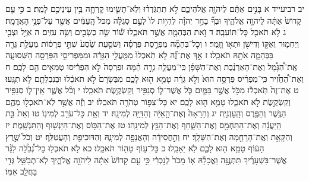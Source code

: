 \documentclass[twoside, openany, parskip=half, 11pt]{book}
\begin{document}
יב רביעייד א בָּנִ֣ים אַתֶּ֔ם לַיהֹוָ֖ה אֱלֹהֵיכֶ֑ם לֹ֣א תִתְגֹּֽדְד֗וּ וְלֹֽא־תָשִׂ֧ימוּ קׇרְחָ֛ה בֵּ֥ין עֵינֵיכֶ֖ם לָמֵֽת׃ ב כִּ֣י עַ֤ם קָדוֹשׁ֙ אַתָּ֔ה לַיהֹוָ֖ה אֱלֹהֶ֑יךָ וּבְךָ֞ בָּחַ֣ר יְהֹוָ֗ה לִֽהְי֥וֹת לוֹ֙ לְעַ֣ם סְגֻלָּ֔ה מִכֹּל֙ הָֽעַמִּ֔ים אֲשֶׁ֖ר עַל־פְּנֵ֥י הָאֲדָמָֽה׃
ג לֹ֥א תֹאכַ֖ל כׇּל־תּוֹעֵבָֽה׃ ד זֹ֥את הַבְּהֵמָ֖ה אֲשֶׁ֣ר תֹּאכֵ֑לוּ שׁ֕וֹר שֵׂ֥ה כְשָׂבִ֖ים וְשֵׂ֥ה עִזִּֽים׃ ה אַיָּ֥ל וּצְבִ֖י וְיַחְמ֑וּר וְאַקּ֥וֹ וְדִישֹׁ֖ן וּתְא֥וֹ וָזָֽמֶר׃ ו וְכׇל־בְּהֵמָ֞ה מַפְרֶ֣סֶת פַּרְסָ֗ה וְשֹׁסַ֤עַת שֶׁ֙סַע֙ שְׁתֵּ֣י פְרָס֔וֹת מַעֲלַ֥ת גֵּרָ֖ה בַּבְּהֵמָ֑ה אֹתָ֖הּ תֹּאכֵֽלוּ׃ ז אַ֣ךְ אֶת־זֶ֞ה לֹ֤א תֹֽאכְלוּ֙ מִמַּֽעֲלֵ֣י הַגֵּרָ֔ה וּמִמַּפְרִיסֵ֥י הַפַּרְסָ֖ה הַשְּׁסוּעָ֑ה אֶֽת־הַ֠גָּמָ֠ל וְאֶת־הָאַרְנֶ֨בֶת וְאֶת־הַשָּׁפָ֜ן כִּֽי־מַעֲלֵ֧ה גֵרָ֣ה הֵ֗מָּה וּפַרְסָה֙ לֹ֣א הִפְרִ֔יסוּ טְמֵאִ֥ים הֵ֖ם לָכֶֽם׃ ח וְאֶת־הַ֠חֲזִ֠יר כִּֽי־מַפְרִ֨יס פַּרְסָ֥ה הוּא֙ וְלֹ֣א גֵרָ֔ה טָמֵ֥א ה֖וּא לָכֶ֑ם מִבְּשָׂרָם֙ לֹ֣א תֹאכֵ֔לוּ וּבְנִבְלָתָ֖ם לֹ֥א תִגָּֽעוּ׃
ט אֶת־זֶה֙ תֹּֽאכְל֔וּ מִכֹּ֖ל אֲשֶׁ֣ר בַּמָּ֑יִם כֹּ֧ל אֲשֶׁר־ל֛וֹ סְנַפִּ֥יר וְקַשְׂקֶ֖שֶׂת תֹּאכֵֽלוּ׃ י וְכֹ֨ל אֲשֶׁ֧ר אֵֽין־ל֛וֹ סְנַפִּ֥יר וְקַשְׂקֶ֖שֶׂת לֹ֣א תֹאכֵ֑לוּ טָמֵ֥א ה֖וּא לָכֶֽם׃
יא כׇּל־צִפּ֥וֹר טְהֹרָ֖ה תֹּאכֵֽלוּ׃ יב וְזֶ֕ה אֲשֶׁ֥ר לֹֽא־תֹאכְל֖וּ מֵהֶ֑ם הַנֶּ֥שֶׁר וְהַפֶּ֖רֶס וְהָֽעׇזְנִיָּֽה׃ יג וְהָרָאָה֙ וְאֶת־הָ֣אַיָּ֔ה וְהַדַּיָּ֖ה לְמִינָֽהּ׃ יד וְאֵ֥ת כׇּל־עֹרֵ֖ב לְמִינֽוֹ׃ טו וְאֵת֙ בַּ֣ת הַֽיַּעֲנָ֔ה וְאֶת־הַתַּחְמָ֖ס וְאֶת־הַשָּׁ֑חַף וְאֶת־הַנֵּ֖ץ לְמִינֵֽהוּ׃ טז אֶת־הַכּ֥וֹס וְאֶת־הַיַּנְשׁ֖וּף וְהַתִּנְשָֽׁמֶת׃ יז וְהַקָּאָ֥ת וְאֶֽת־הָרָחָ֖מָה וְאֶת־הַשָּׁלָֽךְ׃ יח וְהַ֣חֲסִידָ֔ה וְהָאֲנָפָ֖ה לְמִינָ֑הּ וְהַדּוּכִיפַ֖ת וְהָעֲטַלֵּֽף׃ יט וְכֹל֙ שֶׁ֣רֶץ הָע֔וֹף טָמֵ֥א ה֖וּא לָכֶ֑ם לֹ֖א יֵאָכֵֽלוּ׃ כ כׇּל־ע֥וֹף טָה֖וֹר תֹּאכֵֽלוּ׃ כא לֹ֣א תֹאכְל֣וּ כׇל־נְ֠בֵלָ֠ה לַגֵּ֨ר אֲשֶׁר־בִּשְׁעָרֶ֜יךָ תִּתְּנֶ֣נָּה וַאֲכָלָ֗הּ א֤וֹ מָכֹר֙ לְנׇכְרִ֔י כִּ֣י עַ֤ם קָדוֹשׁ֙ אַתָּ֔ה לַיהֹוָ֖ה אֱלֹהֶ֑יךָ לֹֽא־תְבַשֵּׁ֥ל גְּדִ֖י בַּחֲלֵ֥ב אִמּֽוֹ׃
\end{document}
